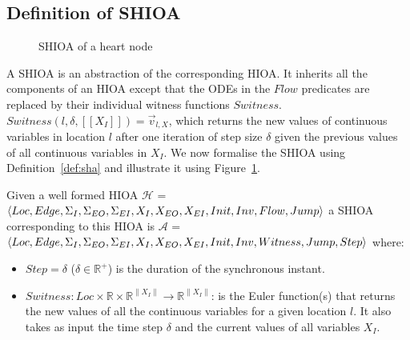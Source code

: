 
\subsection{Definition of \acf{SHIOA}}
\label{sec:defSHA}

\begin{figure}
  \centering
  
  \caption{\acf{SHIOA} of a heart node \label{fig:heartCellSHA}}
\end{figure}

A \ac{SHIOA} is an abstraction of the corresponding \ac{HIOA}.  It
inherits all the components of an \ac{HIOA} except that the ODEs in the
$Flow$ predicates are replaced by their individual witness functions
$Switness$.  $Switness(l,\delta,[\![X_{I}]\!])=\vec{v}_{l,X}$,
which returns the new values of continuous variables in location $l$
after one iteration of step size $\delta$ given the previous values of
all continuous variables in $X_{I}$.  We now formalise the \ac{SHIOA}
using Definition~\ref{def:sha} and illustrate it using
Figure~\ref{fig:heartCellSHA}.

\begin{definition}
  Given a well formed HIOA $\mathcal{H}$ =
  $\langle Loc, Edge, \Sigma_I, \Sigma_{EO}, \Sigma_{EI}, X_I, X_{EO},
  X_{EI}, \linebreak Init, Inv, Flow, Jump\rangle$
  a SHIOA corresponding to this HIOA is $\mathcal{A}$ =
  $\langle Loc, Edge, \Sigma_I, \Sigma_{EO}, \Sigma_{EI}, X_I,
  X_{EO},\linebreak X_{EI}, Init, Inv, Witness, Jump, Step\rangle$
  where:
  \begin{itemize}
  \item $Step = \delta$ ($\delta \in \mathbb{R}^+$) is the duration of
    the synchronous instant.
  \item
    $Switness: Loc \times \mathbb{R} \times \mathbb{R}^{\|X_{I}\|}
    \rightarrow \mathbb{R}^{\|X_{I}\|}$:
    is the Euler function(s) that returns the new values of all the
    continuous variables for a given location $l$.  It also takes as
    input the time step $\delta$ and the current values of all variables
    $X_{I}$.
  \end{itemize}
  \label{def:sha}
\end{definition}


